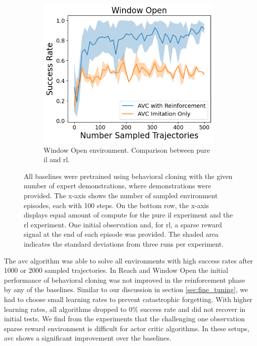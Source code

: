 \begin{figure}[htbp]
\begin{subfigure}[t]{0.45\textwidth}
      \includegraphics[width=\textwidth]{images/1_2000_imi/Window Open.png}
      \caption{Window Open environment. Comparison between pure \ac{il} and \ac{rl}.}
    \end{subfigure}
    \caption{
    All baselines were pretrained using behavioral cloning with the given number of expert demonstrations, where demonstrations were provided. 
    The x-axis shows the number of sampled environment episodes, each with 100 steps. On the bottom row, 
    the x-axis displays equal amount of compute for the pure \ac{il} experiment and the \ac{rl} experiment. 
    One initial observation and, for \ac{rl}, a sparse reward signal at the end of each episode was provided. 
    The shaded area indicates the standard deviations from three runs per experiment.}
    \label{fig:guided_ref}
\end{figure}

The \ac{avc} algorithm was able to solve all environments with high success rates after 1000 or 2000 sampled trajectories. In Reach and Window Open the initial performance
of behavioral cloning was not improved in the reinforcement phase by any of the baselines. Similar to our discussion in section \ref{sec:fine_tuning},
we had to choose small learning rates to prevent catastrophic forgetting. With higher learning rates, all algorithms dropped to $0 \%$ success rate and did
not recover in initial tests. We find from the experiments that the challenging one observation sparse reward environment is difficult for
actor critic algorithms. In these setups, \ac{avc} shows a significant improvement over the baselines.\\

